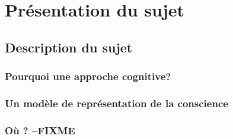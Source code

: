 \part{Présentation du sujet}

\clearemptydoublepage
\chapter{Description du sujet} 


\section{Pourquoi une approche cognitive?} 


\section{Un modèle de représentation de la conscience}
\label{un_modele_de_representation_de_la_conscience}


\section{Où ? --FIXME}
